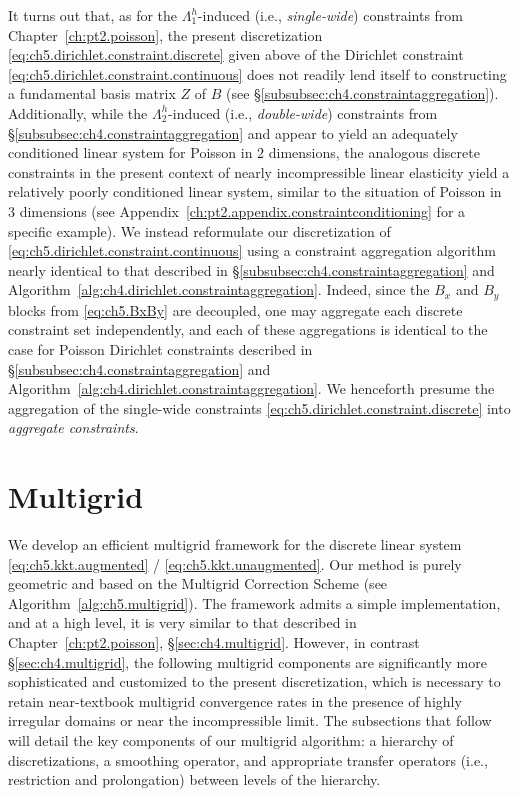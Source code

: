 It turns out that, as for the $\Lambda^h_1$-induced (i.e., \emph{single-wide}) constraints from Chapter~\ref{ch:pt2.poisson}, the present discretization \eqref{eq:ch5.dirichlet.constraint.discrete} given above of the Dirichlet constraint \eqref{eq:ch5.dirichlet.constraint.continuous} does not readily lend itself to constructing a fundamental basis matrix $Z$ of $B$ (see \S\ref{subsubsec:ch4.constraintaggregation}). Additionally, while the $\Lambda^h_2$-induced (i.e., \emph{double-wide}) constraints from \S\ref{subsubsec:ch4.constraintaggregation} and \cite{Bedrossian10} appear to yield an adequately conditioned linear system for Poisson in $2$ dimensions, the analogous discrete constraints in the present context of nearly incompressible linear elasticity yield a relatively poorly conditioned linear system, similar to the situation of Poisson in $3$ dimensions (see Appendix~\ref{ch:pt2.appendix.constraintconditioning} for a specific example). We instead reformulate our discretization of \eqref{eq:ch5.dirichlet.constraint.continuous} using a constraint aggregation algorithm nearly identical to that described in \S\ref{subsubsec:ch4.constraintaggregation} and Algorithm~\ref{alg:ch4.dirichlet.constraintaggregation}. Indeed, since the $B_x$ and $B_y$ blocks from \eqref{eq:ch5.BxBy} are decoupled, one may aggregate each discrete constraint set independently, and each of these aggregations is identical to the case for Poisson Dirichlet constraints described in \S\ref{subsubsec:ch4.constraintaggregation} and Algorithm~\ref{alg:ch4.dirichlet.constraintaggregation}. We henceforth presume the aggregation of the single-wide constraints \eqref{eq:ch5.dirichlet.constraint.discrete} into \emph{aggregate constraints}.

\section{Multigrid} \label{sec:ch5.multigrid}

We develop an efficient multigrid framework for the discrete linear system \eqref{eq:ch5.kkt.augmented} / \eqref{eq:ch5.kkt.unaugmented}. Our method is purely geometric and based on the Multigrid Correction Scheme (see Algorithm~\ref{alg:ch5.multigrid}). The framework admits a simple implementation, and at a high level, it is very similar to that described in Chapter~\ref{ch:pt2.poisson}, \S\ref{sec:ch4.multigrid}. However, in contrast \S\ref{sec:ch4.multigrid}, the following multigrid components are significantly more sophisticated and customized to the present discretization, which is necessary to retain near-textbook multigrid convergence rates in the presence of highly irregular domains or near the incompressible limit. The subsections that follow will detail the key components of our multigrid algorithm: a hierarchy of discretizations, a smoothing operator, and appropriate transfer operators (i.e., restriction and prolongation) between levels of the hierarchy.

